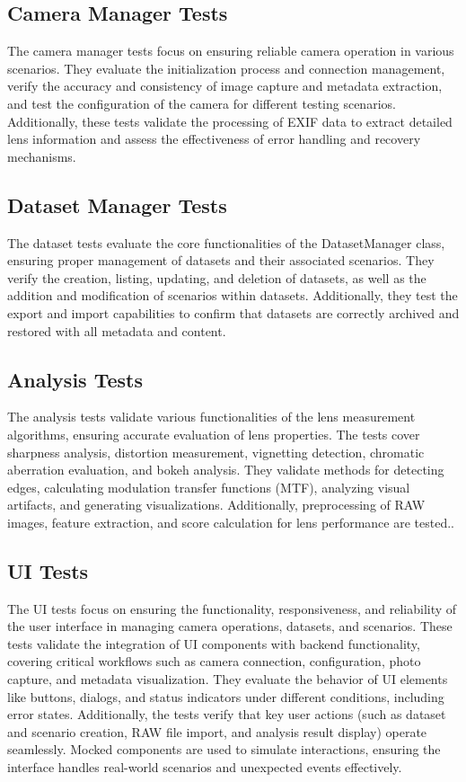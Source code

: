 \subsection{Camera Manager Tests}
The camera manager tests focus on ensuring reliable camera operation in various scenarios. They evaluate the initialization process and connection management, verify the accuracy and consistency of image capture and metadata extraction, and test the configuration of the camera for different testing scenarios. Additionally, these tests validate the processing of EXIF data to extract detailed lens information and assess the effectiveness of error handling and recovery mechanisms.

\subsection{Dataset Manager Tests}

The dataset tests evaluate the core functionalities of the DatasetManager class, ensuring proper management of datasets and their associated scenarios. They verify the creation, listing, updating, and deletion of datasets, as well as the addition and modification of scenarios within datasets. Additionally, they test the export and import capabilities to confirm that datasets are correctly archived and restored with all metadata and content.

\subsection{Analysis Tests}
The analysis tests validate various functionalities of the lens measurement algorithms, ensuring accurate evaluation of lens properties. The tests cover sharpness analysis, distortion measurement, vignetting detection, chromatic aberration evaluation, and bokeh analysis. They validate methods for detecting edges, calculating modulation transfer functions (MTF), analyzing visual artifacts, and generating visualizations. Additionally, preprocessing of RAW images, feature extraction, and score calculation for lens performance are tested..

\subsection{UI Tests}
The UI tests focus on ensuring the functionality, responsiveness, and reliability of the user interface in managing camera operations, datasets, and scenarios. These tests validate the integration of UI components with backend functionality, covering critical workflows such as camera connection, configuration, photo capture, and metadata visualization. They evaluate the behavior of UI elements like buttons, dialogs, and status indicators under different conditions, including error states. Additionally, the tests verify that key user actions (such as dataset and scenario creation, RAW file import, and analysis result display) operate seamlessly. Mocked components are used to simulate interactions, ensuring the interface handles real-world scenarios and unexpected events effectively.

